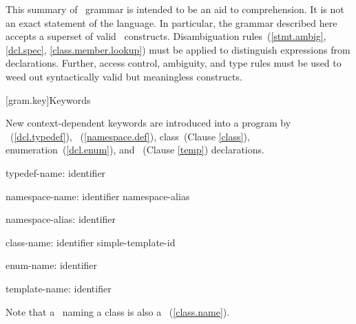 
\pnum
{}%
%
This summary of \Cpp\  grammar is intended to be an aid to comprehension.
It is not an exact statement of the language.
In particular, the grammar described here accepts
a superset of valid \Cpp\  constructs.
Disambiguation rules~(\ref{stmt.ambig}, \ref{dcl.spec}, \ref{class.member.lookup})
must be applied to distinguish expressions from declarations.
Further, access control, ambiguity, and type rules must be used
to weed out syntactically valid but meaningless constructs.

[gram.key]{Keywords}

\pnum
{}%
New context-dependent keywords are introduced into a program by
~(\ref{dcl.typedef}),
~(\ref{namespace.def}),
class~(Clause \ref{class}), enumeration~(\ref{dcl.enum}), and
~(Clause \ref{temp})
declarations.

\begin{ncbnf}
typedef-name:\br
	identifier
\end{ncbnf}

\begin{ncbnf}
namespace-name:\br
	identifier\br
	namespace-alias

namespace-alias:\br
	identifier
\end{ncbnf}

\begin{ncbnf}
class-name:\br
	identifier\br
	simple-template-id
\end{ncbnf}

\begin{ncbnf}
enum-name:\br
	identifier
\end{ncbnf}

\begin{ncbnf}
template-name:\br
	identifier
\end{ncbnf}

Note that a
\
naming a class is also a
\
(\ref{class.name}).

\FlushAndPrintGrammar
